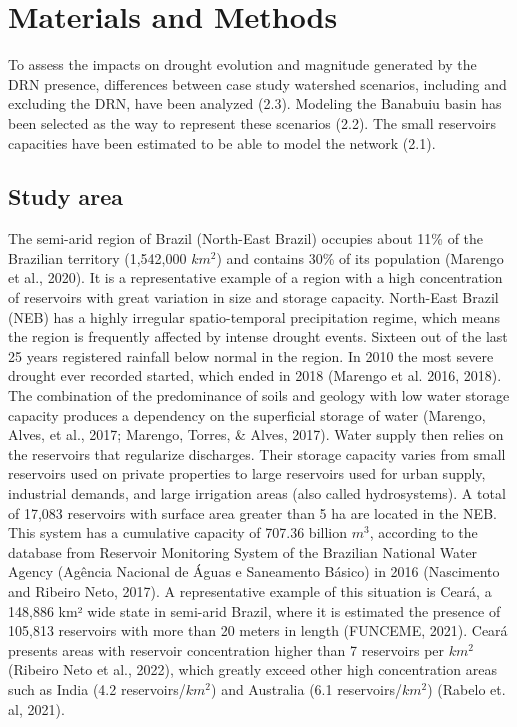 \documentclass[draft]{agujournal2019}
\begin{document}
\section{Materials and Methods}
To assess the impacts on drought evolution and magnitude generated by the DRN presence, differences between case study watershed scenarios, including and excluding the DRN, have been analyzed (2.3). Modeling the Banabuiu basin has been selected as the way to represent these scenarios (2.2). The small reservoirs capacities have been estimated to be able to model the network (2.1).
\subsection{Study area}
The semi-arid region of Brazil (North-East Brazil) occupies about 11\% of the Brazilian territory (1,542,000 $km^2$) and contains 30\% of its population (Marengo et al., 2020). It is a representative example of a region with a high concentration of reservoirs with great variation in size and storage capacity. North-East Brazil (NEB) has a highly irregular spatio-temporal precipitation regime, which means the region is frequently affected by intense drought events. Sixteen out of the last 25 years registered rainfall below normal in the region. In 2010 the most severe drought ever recorded started, which ended in 2018 (Marengo et al. 2016, 2018). The combination of the predominance of soils and geology with low water storage capacity produces a dependency on the superficial storage of water (Marengo, Alves, et al., 2017; Marengo, Torres, & Alves, 2017). Water supply then relies on the reservoirs that regularize discharges. Their storage capacity varies from small reservoirs used on private properties to large reservoirs used for urban supply, industrial demands, and large irrigation areas (also called hydrosystems). A total of 17,083 reservoirs with surface area greater than 5 ha are located in the NEB. This system has a cumulative capacity of 707.36 billion $m^3$, according to the database from Reservoir Monitoring System of the Brazilian National Water Agency (Agência Nacional de Águas e Saneamento Básico) in 2016 (Nascimento and Ribeiro Neto, 2017). A representative example of this situation is Ceará, a 148,886 km² wide state in semi-arid Brazil, where it is estimated the presence of 105,813 reservoirs with more than 20 meters in length (FUNCEME, 2021). Ceará presents areas with reservoir concentration higher than 7 reservoirs per $km^2$ (Ribeiro Neto et al., 2022), which greatly exceed other high concentration areas such as India (4.2 reservoirs/$km^2$) and Australia (6.1 reservoirs/$km^2$) (Rabelo et. al, 2021).\\
\end{document}

